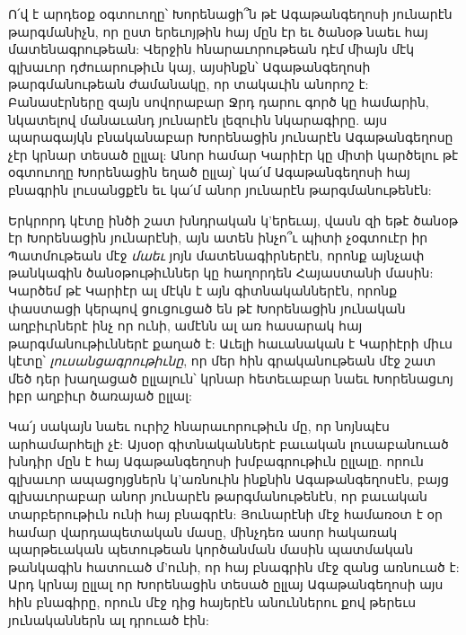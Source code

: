 \documentclass{article}
\begin{document}
{Ո՛վ է արդեօք օգտուողը՝ Խորենացի՞ն թէ Ագաթանգեղոսի յունարէն թարգմանիչն, որ ըստ երեւոյթին հայ մըն էր եւ ծանօթ նաեւ հայ մատենագրութեան: Վերջին հնարաւորութեան դէմ միայն մէկ գլխաւոր դժուարութիւն կայ, այսինքն՝ Ագաթանգեղոսի թարգմանութեան ժամանակը, որ տակաւին անորոշ է: Բանասէրները զայն սովորաբար Ջրդ դարու գործ կը համարին, նկատելով մանաւանդ յունարէն լեզուին նկարագիրը. այս պարագայկն բնականաբար Խորենացին յունարէն Ագաթանգեղոսը չէր կրնար տեսած ըլլալ: Անոր համար Կարիէր կը միտի կարծելու թէ օգտուողը Խորենացին եղած ըլլայ՝ կա՛մ Ագաթանգեղոսի հայ բնագրին լուսանցքէն եւ կա՛մ անոր յունարէն թարգմանութենէն:

Երկրորդ կէտը ինծի շատ խնդրական կ'երեւայ, վասն զի եթէ ծանօթ էր Խորենացին յունարէնի, այն ատեն ինչո՞ւ պիտի չօգտուէր իր Պատմութեան մէջ \emph{մաեւ} յոյն մատենագիրներէն, որոնք այնչափ թանկագին ծանօթութիւններ կը հաղորդեն Հայաստանի մասին: Կարծեմ թէ Կարիէր ալ մէկն է այն գիտնականներէն, որոնք փաստացի կերպով ցուցուցած են թէ Խորենացին յունական աղբիւրներէ ինչ որ ունի, ամէնն ալ առ հասարակ հայ թարգմանութիւններէ քաղած է: Աւելի հաւանական է Կարիէրի միւս կէտը՝ \emph{լուսանցագրութիւնը}, որ մեր հին գրականութեան մէջ շատ մեծ դեր խաղացած ըլլալուն՝ կրնար հետեւաբար նաեւ Խորենացւոյ իբր աղբիւր ծառայած ըլլալ:

Կա՛յ սակայն նաեւ ուրիշ հնարաւորութիւն մը, որ նոյնպէս արհամարհելի չէ: Այսօր գիտնականներէ բաւական լուսաբանուած խնդիր մըն է հայ Ագաթանգեղոսի խմբագրութիւն ըլլալը. որուն գլխաւոր ապացոյցներն կ'առնուին ինքնին Ագաթանգեղոսէն, բայց գլխաւորաբար անոր յունարէն թարգմանութենէն, որ բաւական տարբերութիւն ունի հայ բնագրէն: Յունարէնի մէջ համառօտ է օր համար վարդապետական մասը, մինչդեռ ասոր հակառակ պարթեւական պետութեան կործանման մասին պատմական թանկագին հատուած մ'ունի, որ հայ բնագրին մէջ զանց առնուած է: Արդ կրնայ ըլլալ որ Խորենացին տեսած ըլլայ Ագաթանգեղոսի այս հին բնագիրը, որուն մէջ դից հայերէն անուններու քով թերեւս յունականներն ալ դրուած էին:

}
\end{document}
